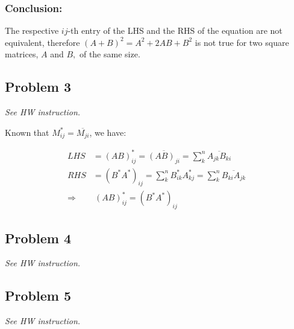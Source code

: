 \documentclass[11pt]{article}
\begin{document}
\subsubsection*{Conclusion:}
The respective $ij$-th entry of the LHS and the RHS of the equation are not equivalent, therefore $(A+B)^2=A^2+2AB+B^2$ is not true for two square matrices, $A$ and $B,$ of the same size.

\subsection*{Problem 3}
\textit{See HW instruction.}\newline

Known that $M_{ij}^* = \overline{M_{ji}}$, we have:

\begin{align*}
    LHS &= (AB)^*_{ij} = \overline{(AB)_{ji}} = \sum^{n}_{k} \overline{A_{jk} B_{ki}} \\
    RHS &= (B^* A^*)_{ij} = \sum^{n}_{k} B^{*}_{ik} A^{*}_{kj} = \sum^{n}_{k} \overline{B_{ki} A_{jk}} \\
    \Longrightarrow& \  (AB)^*_{ij} = (B^* A^*)_{ij}
\end{align*}

\subsection*{Problem 4}
\textit{See HW instruction.}\newline

\subsection*{Problem 5}
\textit{See HW instruction.}\newline
\end{document}
